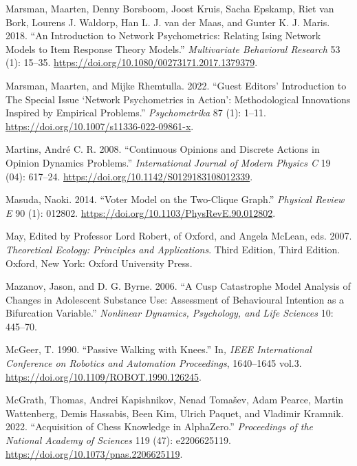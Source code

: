 \documentclass[
  a4paper,
  DIV=11,
  numbers=noendperiod,
  oneside]{scrreprt}
\newlength{\cslhangindent}
\newenvironment{CSLReferences}[2] %
 {\begin{list}{}{%
  \setlength{\itemindent}{0pt}
  \setlength{\leftmargin}{0pt}
  \setlength{\parsep}{0pt}
  \ifodd #1
   \setlength{\leftmargin}{\cslhangindent}
   \setlength{\itemindent}{-1\cslhangindent}
  \fi
  \setlength{\itemsep}{#2\baselineskip}}}
 {\end{list}}
\begin{document}
\begin{CSLReferences}{1}{0}
Marsman, Maarten, Denny Borsboom, Joost Kruis, Sacha Epskamp, Riet van
Bork, Lourens J. Waldorp, Han L. J. van der Maas, and Gunter K. J.
Maris. 2018. {``An Introduction to Network Psychometrics: Relating Ising
Network Models to Item Response Theory Models.''} \emph{Multivariate
Behavioral Research} 53 (1): 15--35.
\url{https://doi.org/10.1080/00273171.2017.1379379}.

Marsman, Maarten, and Mijke Rhemtulla. 2022. {``Guest {Editors}'
{Introduction} to {The Special Issue} {`{Network Psychometrics} in
{Action}'}: {Methodological Innovations Inspired} by {Empirical
Problems}.''} \emph{Psychometrika} 87 (1): 1--11.
\url{https://doi.org/10.1007/s11336-022-09861-x}.

Martins, André C. R. 2008. {``Continuous Opinions and Discrete Actions
in Opinion Dynamics Problems.''} \emph{International Journal of Modern
Physics C} 19 (04): 617--24.
\url{https://doi.org/10.1142/S0129183108012339}.

Masuda, Naoki. 2014. {``Voter Model on the Two-Clique Graph.''}
\emph{Physical Review E} 90 (1): 012802.
\url{https://doi.org/10.1103/PhysRevE.90.012802}.

May, Edited by Professor Lord Robert, of Oxford, and Angela McLean, eds.
2007. \emph{Theoretical {Ecology}: {Principles} and {Applications}}.
Third Edition, Third Edition. {Oxford, New York}: {Oxford University
Press}.

Mazanov, Jason, and D. G. Byrne. 2006. {``A {Cusp Catastrophe Model
Analysis} of {Changes} in {Adolescent Substance Use}: {Assessment} of
{Behavioural Intention} as a {Bifurcation Variable}.''} \emph{Nonlinear
Dynamics, Psychology, and Life Sciences} 10: 445--70.

McGeer, T. 1990. {``Passive Walking with Knees.''} In\emph{, {IEEE
International Conference} on {Robotics} and {Automation Proceedings}},
1640--1645 vol.3. \url{https://doi.org/10.1109/ROBOT.1990.126245}.

McGrath, Thomas, Andrei Kapishnikov, Nenad Tomašev, Adam Pearce, Martin
Wattenberg, Demis Hassabis, Been Kim, Ulrich Paquet, and Vladimir
Kramnik. 2022. {``Acquisition of Chess Knowledge in {AlphaZero}.''}
\emph{Proceedings of the National Academy of Sciences} 119 (47):
e2206625119. \url{https://doi.org/10.1073/pnas.2206625119}.


\end{CSLReferences}
\end{document}
